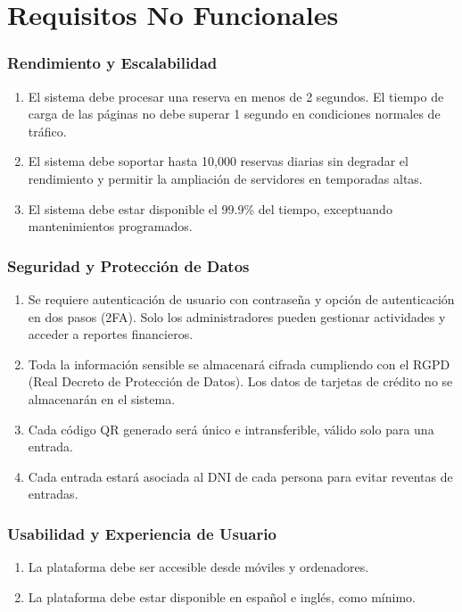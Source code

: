 \chapter{Requisitos No Funcionales}

\subsection*{Rendimiento y Escalabilidad}
\begin{enumerate}[label=\textcolor{red}{RNF\arabic*}:]
    \item El sistema debe procesar una reserva en menos de 2 segundos. El tiempo de carga de las páginas no debe superar 1 segundo en condiciones normales de tráfico.
    \item El sistema debe soportar hasta 10,000 reservas diarias sin degradar el rendimiento y permitir la ampliación de servidores en temporadas altas.
    \item El sistema debe estar disponible el 99.9\% del tiempo, exceptuando mantenimientos programados.
\end{enumerate}

\subsection*{Seguridad y Protección de Datos}
\begin{enumerate}[label=\textcolor{red}{RNF\arabic*}:]
    \item Se requiere autenticación de usuario con contraseña y opción de autenticación en dos pasos (2FA). Solo los administradores pueden gestionar actividades y acceder a reportes financieros.
    \item Toda la información sensible se almacenará cifrada cumpliendo con el RGPD (Real Decreto de Protección de Datos). Los datos de tarjetas de crédito no se almacenarán en el sistema.
    \item Cada código QR generado será único e intransferible, válido solo para una entrada.
    \item Cada entrada estará asociada al DNI de cada persona para evitar reventas de entradas.
\end{enumerate}

\subsection*{Usabilidad y Experiencia de Usuario}
\begin{enumerate}[label=\textcolor{red}{RNF\arabic*}:]
    \item La plataforma debe ser accesible desde móviles y ordenadores.
    \item La plataforma debe estar disponible en español e inglés, como mínimo.
\end{enumerate}

